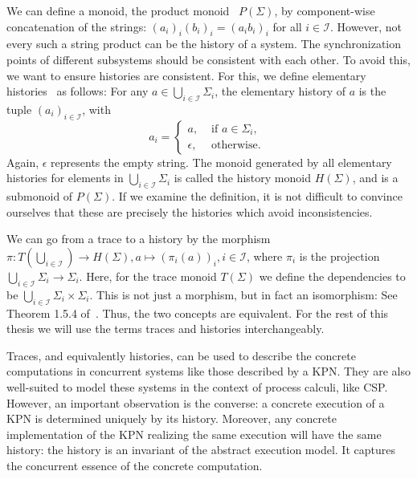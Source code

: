 We can define a monoid, the product monoid~ $P(\Sigma)$, by component-wise concatenation of the strings: $(a_i)_i (b_i)_i = (a_ib_i)_i$ for all $i \in \mathcal{I}$.
However, not every such a string product can be the history of a system.
The synchronization points of different subsystems should be consistent with each other. 
To avoid this, we want to ensure histories are consistent. For this, we define elementary histories~ as follows:
For any $a \in \bigcup_{i \in \mathcal{I}} \Sigma_i$, the elementary history of $a$ is the tuple $(a_i)_{i \in \mathcal{I}}$, with
 \[a_i = \left\{ \begin{array}{ll} a, & \text{ if } a \in \Sigma_i, \\ \epsilon, & \text{ otherwise. }\end{array}\right.\]
Again, $\epsilon$ represents the empty string.
The monoid generated by all elementary histories for elements in $\bigcup_{i \in \mathcal{I}} \Sigma_i$ is called the history monoid $H(\Sigma)$, and is a submonoid of $P(\Sigma)$.
If we examine the definition, it is not difficult to convince ourselves that these are precisely the histories which avoid inconsistencies.%


We can go from a trace to a history by the morphism $\pi: T(\bigcup_{i \in \mathcal{I}}) \rightarrow H(\Sigma), a \mapsto (\pi_i(a))_i, i \in \mathcal{I}$, where $\pi_i$ is the projection $\bigcup_{i \in \mathcal{I}}\Sigma_i \rightarrow \Sigma_i$.
Here, for the trace monoid $T(\Sigma)$ we define the dependencies to be $\bigcup_{i \in \mathcal{I}}\Sigma_i \times \Sigma_i$. 
This is not just a morphism, but in fact an isomorphism: See Theorem 1.5.4 of~\cite{mazurkiewicz1995introduction}.
Thus, the two concepts are equivalent.
For the rest of this thesis we will use the terms traces and histories interchangeably.


Traces, and equivalently histories, can be used to describe the concrete computations in concurrent systems like those described by a \ac{KPN}.
They are also well-suited to model these systems in the context of process calculi, like \ac{CSP}.
However, an important observation is the converse: a concrete execution of a \ac{KPN} is determined uniquely by its history.
Moreover, any concrete implementation of the \ac{KPN} realizing the same execution will have the same history: the history is an invariant of the abstract execution model.
It captures the concurrent essence of the concrete computation.

